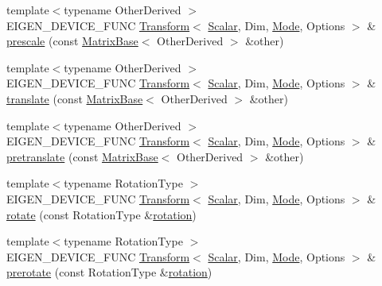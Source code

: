 \begin{DoxyCompactItemize}
\item 
{\footnotesize template$<$typename Other\+Derived $>$ }\\E\+I\+G\+E\+N\+\_\+\+D\+E\+V\+I\+C\+E\+\_\+\+F\+U\+NC \mbox{\hyperlink{class_eigen_1_1_transform}{Transform}}$<$ \mbox{\hyperlink{class_eigen_1_1_transform_a4e69ced9d651745b8ed4eda46f41795d}{Scalar}}, Dim, \mbox{\hyperlink{struct_mode}{Mode}}, Options $>$ \& \mbox{\hyperlink{class_eigen_1_1_transform_a561ed5c33659c1698762e32dbc1a02e4}{prescale}} (const \mbox{\hyperlink{class_eigen_1_1_matrix_base}{Matrix\+Base}}$<$ Other\+Derived $>$ \&other)
\item 
{\footnotesize template$<$typename Other\+Derived $>$ }\\E\+I\+G\+E\+N\+\_\+\+D\+E\+V\+I\+C\+E\+\_\+\+F\+U\+NC \mbox{\hyperlink{class_eigen_1_1_transform}{Transform}}$<$ \mbox{\hyperlink{class_eigen_1_1_transform_a4e69ced9d651745b8ed4eda46f41795d}{Scalar}}, Dim, \mbox{\hyperlink{struct_mode}{Mode}}, Options $>$ \& \mbox{\hyperlink{class_eigen_1_1_transform_a2afd15b4e0800382ba743703e16e025b}{translate}} (const \mbox{\hyperlink{class_eigen_1_1_matrix_base}{Matrix\+Base}}$<$ Other\+Derived $>$ \&other)
\item 
{\footnotesize template$<$typename Other\+Derived $>$ }\\E\+I\+G\+E\+N\+\_\+\+D\+E\+V\+I\+C\+E\+\_\+\+F\+U\+NC \mbox{\hyperlink{class_eigen_1_1_transform}{Transform}}$<$ \mbox{\hyperlink{class_eigen_1_1_transform_a4e69ced9d651745b8ed4eda46f41795d}{Scalar}}, Dim, \mbox{\hyperlink{struct_mode}{Mode}}, Options $>$ \& \mbox{\hyperlink{class_eigen_1_1_transform_a9ceb0c150d540e9252d57a5862dbe06f}{pretranslate}} (const \mbox{\hyperlink{class_eigen_1_1_matrix_base}{Matrix\+Base}}$<$ Other\+Derived $>$ \&other)
\item 
{\footnotesize template$<$typename Rotation\+Type $>$ }\\E\+I\+G\+E\+N\+\_\+\+D\+E\+V\+I\+C\+E\+\_\+\+F\+U\+NC \mbox{\hyperlink{class_eigen_1_1_transform}{Transform}}$<$ \mbox{\hyperlink{class_eigen_1_1_transform_a4e69ced9d651745b8ed4eda46f41795d}{Scalar}}, Dim, \mbox{\hyperlink{struct_mode}{Mode}}, Options $>$ \& \mbox{\hyperlink{class_eigen_1_1_transform_a805791cdc4ab236c1b878970e10865b6}{rotate}} (const Rotation\+Type \&\mbox{\hyperlink{class_eigen_1_1_transform_a87eb429e076e2c15a1bfbe99b43ae07c}{rotation}})
\item 
{\footnotesize template$<$typename Rotation\+Type $>$ }\\E\+I\+G\+E\+N\+\_\+\+D\+E\+V\+I\+C\+E\+\_\+\+F\+U\+NC \mbox{\hyperlink{class_eigen_1_1_transform}{Transform}}$<$ \mbox{\hyperlink{class_eigen_1_1_transform_a4e69ced9d651745b8ed4eda46f41795d}{Scalar}}, Dim, \mbox{\hyperlink{struct_mode}{Mode}}, Options $>$ \& \mbox{\hyperlink{class_eigen_1_1_transform_a07c9c785fad5133485d4f4e6e2081593}{prerotate}} (const Rotation\+Type \&\mbox{\hyperlink{class_eigen_1_1_transform_a87eb429e076e2c15a1bfbe99b43ae07c}{rotation}})

\end{DoxyCompactItemize}
